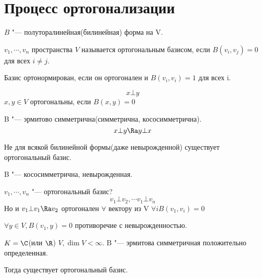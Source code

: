 ﻿\section{Процесс ортогонализации}
\begin{Def}
$B$ "--- полуторалинейная(билинейная) форма на V.

$v_1, \cdots, v_n$ пространства $V$ называется ортогональным базисом, если 
$B(v_i, v_j) = 0$ для всех $i \ne j$.

Базис ортонормирован, если он ортогонален и $B(v_i, v_i) = 1$ для всех i.
\end{Def}
\begin{Def}
 $$x \bot y $$
 $x, y \in V$ ортогональны, если $B(x, y) = 0$ 
 
\end{Def}
\begin{Rem}
 B "--- эрмитово симметрична(симметрична, кососимметрична).
 $$x \bot y \Ra y \bot x$$
\end{Rem}
\begin{Rem}
 Не для всякой билинейной формы(даже невырожденной) существует 
 ортогональный базис.
\end{Rem}
\begin{exmp}
B "--- кососимметрична, невырожденная. 

$v_1, \cdots, v_n$ "--- ортогональный базис?
$$v_1 \bot v_2, \cdots v_1 \bot v_n$$
Но и $v_1 \bot v_1 \Ra v_2$ ортогонален $\forall$ вектору
из V $\forall i B(v_1, v_i) = 0$

$\forall y \in V, B(v_1, y) = 0$ противоречие с невырожденностью.
\end{exmp}
\begin{theorem}{}
$K = \C$(или $\R$) $V, \dim V < \infty$.
B "--- эрмитова симметричная положительно определенная.

Тогда существует ортогональный базис.
\end{theorem}
